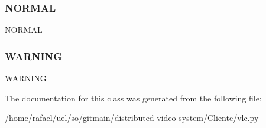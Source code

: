 \subsubsection{\texorpdfstring{N\+O\+R\+M\+AL}{NORMAL}}
{\footnotesize\ttfamily N\+O\+R\+M\+AL\hspace{0.3cm}{\ttfamily [static]}}

\mbox{\label{classvlc_1_1_dialog_question_type_a1dfc73ab73898d3f4f348d462a5d126a}} 
\subsubsection{\texorpdfstring{W\+A\+R\+N\+I\+NG}{WARNING}}
{\footnotesize\ttfamily W\+A\+R\+N\+I\+NG\hspace{0.3cm}{\ttfamily [static]}}



The documentation for this class was generated from the following file\+:\begin{DoxyCompactItemize}
\item 
/home/rafael/uel/so/gitmain/distributed-\/video-\/system/\+Cliente/\hyperlink{vlc_8py}{vlc.\+py}\end{DoxyCompactItemize}

